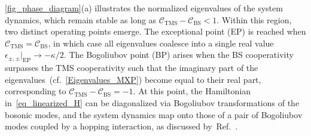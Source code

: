 \documentclass[%
reprint,
floatfix,
superscriptaddress,
amsmath,amssymb,
aps,
pra,
]{revtex4-2}
\newcommand*{\scrpt}[1]{\mathrm{#1}}
\newcommand*{\s}[1]{\ensuremath{_\scrpt{#1}}}
\begin{document}
\cref{fig_phase_diagram}(a) illustrates the normalized eigenvalues of the system dynamics, which remain stable as long as $\mathcal{C}_{\mathrm{TMS}} - \mathcal{C}_{\mathrm{BS}} < 1$. 
Within this region, two distinct operating points emerge. 
The exceptional point (EP) is reached when $\mathcal{C}\s{TMS} = \mathcal{C}\s{BS}$, in which case all eigenvalues coalesce into a single real value $\epsilon_{\pm, \pm}|_{\mathrm{EP}} \rightarrow - \kappa /2$. 
The Bogoliubov point (BP) arises when the BS cooperativity surpasses the TMS cooperativity such that the imaginary part of the eigenvalues~(cf.~\cref{Eigenvalues_MXP}) become equal to their real part, corresponding to $\mathcal{C}_{\mathrm{TMS}} - \mathcal{C}_{\mathrm{BS}} = -1$. At this point, the Hamiltonian in~\cref{eq_linearized_H} can be diagonalized via Bogoliubov transformations of the bosonic modes, and the system dynamics map onto those of a pair of Bogoliubov modes coupled by a hopping interaction, as discussed by~Ref.~\cite{Metelmann2022Bog}.
\end{document}
